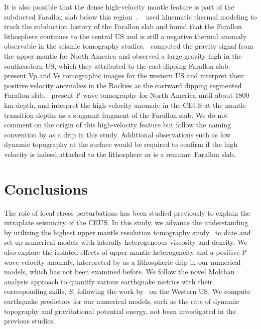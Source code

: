 \documentclass[draft,linenumbers]{agujournal2018}
\begin{document}
 It is also possible that the dense high-velocity mantle feature is part of the subducted Farallon slab below this region~\citep{schmid2002fate, mooney2010north, sigloch2008two, schmandt2010complex, sigloch2011mantle}. ~\citet{schmid2002fate} used kinematic thermal modeling to track the subduction history of the Farallon slab and found that the Farallon lithosphere continues to the central US and is still a negative thermal anomaly observable in the seismic tomography studies.~\citet{mooney2010north} computed the gravity signal from the upper mantle for North America and observed a large gravity high in the southeastern US, which they attributed to the east-dipping Farallon slab.~\citet{schmandt2010complex} present Vp and Vs tomographic images for the western US and interpret their positive velocity anomalies in the Rockies as the eastward dipping segmented Farallon slab.~\citet{sigloch2008two, sigloch2011mantle} present P-wave tomography for North America until about 1800 km depth, and interpret the high-velocity anomaly in the CEUS at the mantle transition depths as a stagnant fragment of the Farallon slab.  We do not comment on the origin of this high-velocity feature but follow the naming convention by \citet{Biryol_2016} as a drip in this study. Additional observations such as low dynamic topography at the surface would be required to confirm if the high velocity is indeed attached to the lithosphere or is a remnant Farallon slab.
  
\section{Conclusions}

The role of local stress perturbations has been studied previously to explain the intraplate seismicity of the CEUS. In this study, we advance the understanding by utilizing the highest upper mantle resolution tomography study~\citep{Biryol_2016} to date and set up numerical models with laterally heterogeneous viscosity and density. We also explore the isolated effects of upper-mantle heterogeneity and a positive P-wave velocity anomaly, interpreted by \citet{Biryol_2016} as a lithospheric drip in our numerical models, which has not been examined before. We follow the novel Molchan analysis approach to quantify various earthquake metrics with their corresponding skills, $S$, following the work by~\citet{becker2015western} on the Western US. We compute earthquake predictors for our numerical models, such as the rate of dynamic topography and gravitational potential energy, not been investigated in the previous studies.
\end{document}
